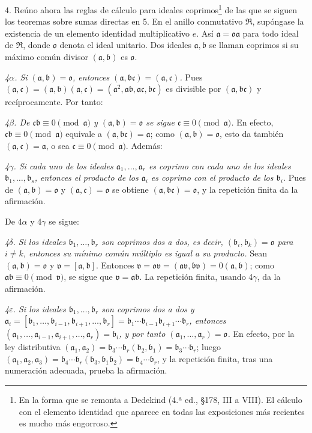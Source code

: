 \documentclass[11pt]{article}
\providecommand{\mR}{\mathfrak{R}}
\providecommand{\ma}{\mathfrak{a}}
\providecommand{\mb}{\mathfrak{b}}
\providecommand{\mc}{\mathfrak{c}}
\providecommand{\mo}{\mathfrak{o}}
\providecommand{\mv}{\mathfrak{v}}
\begin{document}
4. Reúno ahora las reglas de cálculo para ideales coprimos\footnote{En la forma que se remonta a Dedekind (4.ª ed., §178, III a VIII). El cálculo con el elemento identidad que aparece en todas las exposiciones más recientes es mucho más engorroso.} de las que se siguen los teoremas sobre sumas directas en 5. En el anillo conmutativo $\mR$, supóngase la existencia de un elemento identidad multiplicativo $e$. Así $\ma=\mo\ma$ para todo ideal de $\mR$, donde $\mo$ denota el ideal unitario. Dos ideales $\ma,\mb$ se llaman coprimos si su máximo común divisor $(\ma,\mb)$ es $\mo$.

\emph{4$\alpha$. Si $(\ma,\mb)=\mo$, entonces $(\ma,\mb\mc)=(\ma,\mc)$.} Pues $(\ma,\mc)=(\ma,\mb)(\ma,\mc)=(\ma^2,\ma\mb,\ma\mc,\mb\mc)$ es divisible por $(\ma,\mb\mc)$ y recíprocamente. Por tanto:

\emph{4$\beta$. De $\mc\mb\equiv0\pmod{\ma}$ y $(\ma,\mb)=\mo$ se sigue $\mc\equiv0\pmod{\ma}$.} En efecto, $\mc\mb\equiv0\pmod{\ma}$ equivale a $(\ma,\mb\mc)=\ma$; como $(\ma,\mb)=\mo$, esto da también $(\ma,\mc)=\ma$, o sea $\mc\equiv0\pmod{\ma}$. Además:

\emph{4$\gamma$. Si cada uno de los ideales $\ma_1,\ldots,\ma_r$ es coprimo con cada uno de los ideales $\mb_1,\ldots,\mb_s$, entonces el producto de los $\ma_i$ es coprimo con el producto de los $\mb_i$.} Pues de $(\ma,\mb)=\mo$ y $(\ma,\mc)=\mo$ se obtiene $(\ma,\mb\mc)=\mo$, y la repetición finita da la afirmación.

De 4$\alpha$ y 4$\gamma$ se sigue:

\emph{4$\delta$. Si los ideales $\mb_1,\ldots,\mb_r$ son coprimos dos a dos, es decir, $(\mb_i,\mb_k)=\mo$ para $i\ne k$, entonces su mínimo común múltiplo es igual a su producto.} Sean $(\ma,\mb)=\mo$ y $\mv=[\ma,\mb]$. Entonces $\mv=\mo\mv=(\ma\mv,\mb\mv)=0(\ma,\mb)$; como $\ma\mb\equiv0\pmod{\mv}$, se sigue que $\mv=\ma\mb$. La repetición finita, usando 4$\gamma$, da la afirmación.

\emph{4$\varepsilon$. Si los ideales $\mb_1,\ldots,\mb_r$ son coprimos dos a dos y $\ma_i=[\mb_1,\ldots,\mb_{i-1},\mb_{i+1},\ldots,\mb_r]=\mb_1\cdots\mb_{i-1}\mb_{i+1}\cdots\mb_r$, entonces $(\ma_1,\ldots,\ma_{i-1},\ma_{i+1},\ldots,\ma_r)=\mb_i$, y por tanto $(\ma_1,\ldots,\ma_r)=\mo$.} En efecto, por la ley distributiva $(\ma_1,\ma_2)=\mb_3\cdots\mb_r(\mb_2,\mb_1)=\mb_3\cdots\mb_r$; luego $(\ma_1,\ma_2,\ma_3)=\mb_4\cdots\mb_r(\mb_3,\mb_1\mb_2)=\mb_4\cdots\mb_r$, y la repetición finita, tras una numeración adecuada, prueba la afirmación.
\end{document}
